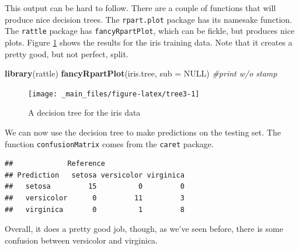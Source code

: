 \documentclass[
]{book}
\newenvironment{Shaded}{\begin{snugshade}}{\end{snugshade}}
\newcommand{\AttributeTok}[1]{\textcolor[rgb]{0.13,0.29,0.53}{#1}}
\newcommand{\CommentTok}[1]{\textcolor[rgb]{0.56,0.35,0.01}{\textit{#1}}}
\newcommand{\ConstantTok}[1]{\textcolor[rgb]{0.56,0.35,0.01}{#1}}
\newcommand{\FunctionTok}[1]{\textcolor[rgb]{0.13,0.29,0.53}{\textbf{#1}}}
\newcommand{\NormalTok}[1]{#1}
\newcommand{\OtherTok}[1]{\textcolor[rgb]{0.56,0.35,0.01}{#1}}
\newcommand{\SpecialCharTok}[1]{\textcolor[rgb]{0.81,0.36,0.00}{\textbf{#1}}}
\newcommand{\StringTok}[1]{\textcolor[rgb]{0.31,0.60,0.02}{#1}}
\theoremstyle{definition}
\theoremstyle{definition}
\theoremstyle{definition}
\theoremstyle{definition}
\theoremstyle{remark}
\begin{document}
This output can be hard to follow. There are a couple of functions that will produce nice decision trees. The \texttt{rpart.plot} package has its namesake function. The \texttt{rattle} package has \texttt{fancyRpartPlot}, which can be fickle, but produces nice plots. Figure \ref{fig:tree3} shows the results for the iris training data. Note that it creates a pretty good, but not perfect, split.

\begin{Shaded}
\begin{Highlighting}[]
\FunctionTok{library}\NormalTok{(rattle)}
\FunctionTok{fancyRpartPlot}\NormalTok{(iris.tree, }\AttributeTok{sub =} \ConstantTok{NULL}\NormalTok{) }\CommentTok{\#print w/o stamp}
\end{Highlighting}
\end{Shaded}

\begin{figure}

{\centering \texttt{[image: \_main\_files/figure-latex/tree3-1]} 

}

\caption{A decision tree for the iris data}\label{fig:tree3}
\end{figure}

We can now use the decision tree to make predictions on the testing set. The function \texttt{confusionMatrix} comes from the \texttt{caret} package.

\begin{Shaded}
\end{Shaded}

\begin{verbatim}
##             Reference
## Prediction   setosa versicolor virginica
##   setosa         15          0         0
##   versicolor      0         11         3
##   virginica       0          1         8
\end{verbatim}

Overall, it does a pretty good job, though, as we've seen before, there is some confusion between versicolor and virginica.
\end{document}
